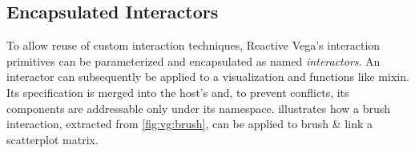 \subsection{Encapsulated Interactors}

To allow reuse of custom interaction techniques, Reactive Vega's interaction
primitives can be parameterized and encapsulated as named \emph{interactors}. An
interactor can subsequently be applied to a visualization and functions like
mixin. Its specification is merged into the host's and, to prevent conflicts,
its components are addressable only under its namespace.
 illustrates how a brush interaction, extracted
from \cref{fig:vg:brush}, can be applied to brush \& link a scatterplot matrix.